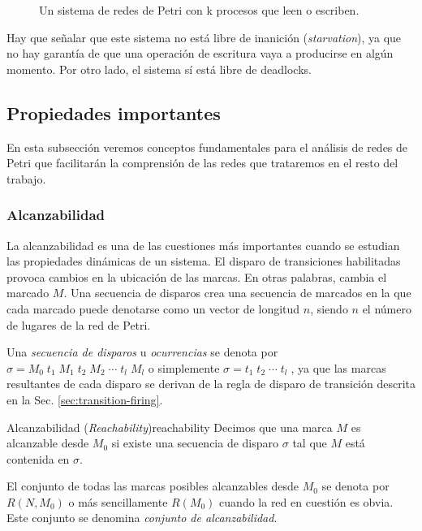 \begin{figure}[!htbp]
      \centering
      
      \caption{Un sistema de redes de Petri con k procesos que leen o escriben.}
      \label{fig:readers-writers-example}
\end{figure}

Hay que señalar que este sistema no está libre de inanición (\textit{starvation}),
ya que no hay garantía de que una operación de escritura vaya a producirse en algún momento.
Por otro lado, el sistema sí está libre de deadlocks.

\subsection{Propiedades importantes}

En esta subsección veremos conceptos fundamentales para el análisis de redes de Petri que
facilitarán la comprensión de las redes que trataremos en el resto del trabajo.

\subsubsection{Alcanzabilidad}
\label{sec:reachability}

La alcanzabilidad es una de las cuestiones más importantes cuando se estudian las propiedades
dinámicas de un sistema. El disparo de transiciones habilitadas provoca cambios en la
ubicación de las marcas. En otras palabras, cambia el marcado $M$. Una secuencia de disparos
crea una secuencia de marcados en la que cada marcado puede denotarse como un vector de
longitud $n$, siendo $n$ el número de lugares de la red de Petri.

Una \emph{secuencia de disparos} u \emph{ocurrencias} se denota por
$ \sigma = M_0\; t_1\; M_1\; t_2\; M_2\; \cdots\; t_l\; M_l$ o simplemente
$ \sigma = t_1\; t_2\; \cdots\; t_l\; $, ya que las marcas
resultantes de cada disparo se derivan de la
regla de disparo de transición descrita en la Sec. \ref{sec:transition-firing}.

\begin{definition}{Alcanzabilidad (\textit{Reachability})}{reachability}
      Decimos que una marca $M$ es alcanzable desde $M_0$ si existe una secuencia de disparo $\sigma$
      tal que $M$ está contenida en $\sigma$.
\end{definition}

El conjunto de todas las marcas posibles alcanzables desde $M_0$ se denota por $R(N, M_0)$ o más
sencillamente $R(M_0)$ cuando la red en cuestión es obvia. Este conjunto se denomina \emph{conjunto de alcanzabilidad}.

